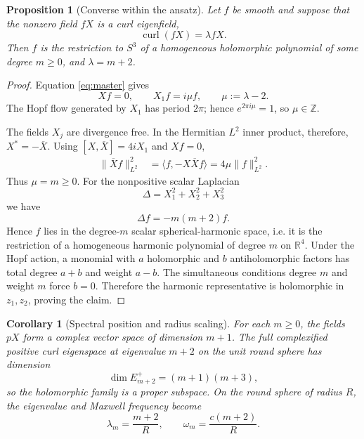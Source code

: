 \documentclass[11pt,a4paper]{article}
\numberwithin{equation}{section}
\newtheorem{proposition}[theorem]{Proposition}
\newtheorem{corollary}[theorem]{Corollary}
\theoremstyle{remark}
\newcommand{\curl}{\operatorname{curl}}
\newcommand{\RR}{\mathbb{R}}
\begin{document}
\begin{proposition}[Converse within the ansatz]\label{prop:converse}
Let \(f\) be smooth and suppose that the nonzero field \(fX\) is a curl eigenfield,
\[
 \curl(fX)=\lambda fX.
\]
Then \(f\) is the restriction to \(S^3\) of a homogeneous holomorphic polynomial of some degree \(m\ge0\), and \(\lambda=m+2\).
\end{proposition}

\begin{proof}
Equation \eqref{eq:master} gives
\begin{equation}\label{eq:converse1}
 Xf=0,
 \qquad
 X_1f=i\mu f,
 \qquad
 \mu:=\lambda-2.
\end{equation}
The Hopf flow generated by \(X_1\) has period \(2\pi\); hence \(e^{2\pi i\mu}=1\), so \(\mu\in\mathbb Z\).

The fields \(X_j\) are divergence free. In the Hermitian \(L^2\) inner product, therefore, \(X^*=-\overline X\). Using \([X,\overline X]=4iX_1\) and \(Xf=0\),
\begin{align}
 \|\overline Xf\|_{L^2}^2
 &=\langle f,-X\overline Xf\rangle
 =4\mu\|f\|_{L^2}^2.
\end{align}
Thus \(\mu=m\ge0\). For the nonpositive scalar Laplacian
\[
 \Delta=X_1^2+X_2^2+X_3^2
\]
we have
\begin{equation}\label{eq:scalarharm}
 \Delta f=-m(m+2)f.
\end{equation}
Hence \(f\) lies in the degree-\(m\) scalar spherical-harmonic space, i.e. it is the restriction of a homogeneous harmonic polynomial of degree \(m\) on \(\RR^4\). Under the Hopf action, a monomial with \(a\) holomorphic and \(b\) antiholomorphic factors has total degree \(a+b\) and weight \(a-b\). The simultaneous conditions degree \(m\) and weight \(m\) force \(b=0\). Therefore the harmonic representative is holomorphic in \(z_1,z_2\), proving the claim.
\end{proof}

\begin{corollary}[Spectral position and radius scaling]\label{cor:radius}
For each \(m\ge0\), the fields \(pX\) form a complex vector space of dimension \(m+1\). The full complexified positive curl eigenspace at eigenvalue \(m+2\) on the unit round sphere has dimension
\begin{equation}\label{eq:dimensions}
 \dim E^+_{m+2}=(m+1)(m+3),
\end{equation}
so the holomorphic family is a proper subspace. On the round sphere of radius \(R\), the eigenvalue and Maxwell frequency become
\begin{equation}\label{eq:radius}
 \lambda_m=\frac{m+2}{R},
 \qquad
 \omega_m=\frac{c(m+2)}{R}.
\end{equation}
\end{corollary}
\end{document}
